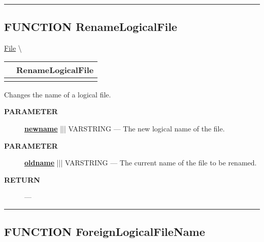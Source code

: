 \rule{\linewidth}{0.5pt}
\subsection*{\textsf{\colorbox{headtoc}{\color{white} FUNCTION}
RenameLogicalFile}}

\hypertarget{ecldoc:file.renamelogicalfile}{}
\hspace{0pt} \hyperlink{ecldoc:File}{File} \textbackslash 

{\renewcommand{\arraystretch}{1.5}
\begin{tabularx}{\textwidth}{|>{\raggedright\arraybackslash}l|X|}
\hline
\hspace{0pt}\mytexttt{\color{red} } & \textbf{RenameLogicalFile} \\
\hline
\multicolumn{2}{|>{\raggedright\arraybackslash}X|}{\hspace{0pt}\mytexttt{\color{param} (varstring oldname, varstring newname)}} \\
\hline
\end{tabularx}
}

\par





Changes the name of a logical file.






\par
\begin{description}
\item [\colorbox{tagtype}{\color{white} \textbf{\textsf{PARAMETER}}}] \textbf{\underline{newname}} ||| VARSTRING --- The new logical name of the file.
\item [\colorbox{tagtype}{\color{white} \textbf{\textsf{PARAMETER}}}] \textbf{\underline{oldname}} ||| VARSTRING --- The current name of the file to be renamed.
\end{description}







\par
\begin{description}
\item [\colorbox{tagtype}{\color{white} \textbf{\textsf{RETURN}}}] \textbf{} --- 
\end{description}




\rule{\linewidth}{0.5pt}
\subsection*{\textsf{\colorbox{headtoc}{\color{white} FUNCTION}
ForeignLogicalFileName}}

